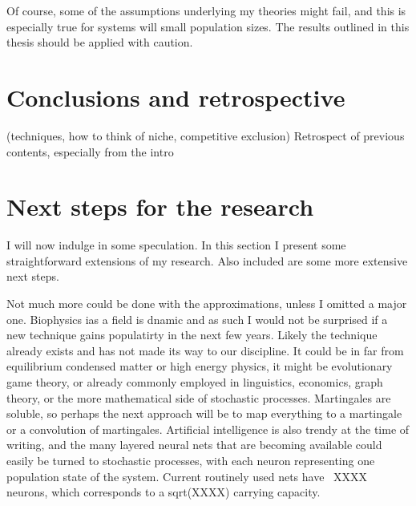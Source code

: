 Of course, some of the assumptions underlying my theories might fail, and this is especially true for systems will small population sizes. 
The results outlined in this thesis should be applied with caution. 



\section{Conclusions and retrospective}
 (techniques, how to think of niche, competitive exclusion)
Retrospect of previous contents, especially from the intro


\section{Next steps for the research}
I will now indulge in some speculation. 
In this section I present some straightforward extensions of my research. 
Also included are some more extensive next steps. 

Not much more could be done with the approximations, unless I omitted a major one. 
Biophysics ias a field is dnamic and as such I would not be surprised if a new technique gains populatirty in the next few years. 
Likely the technique already exists and has not made its way to our discipline. 
It could be in far from equilibrium condensed matter or high energy physics, it might be evolutionary game theory, or already commonly employed in linguistics, economics, graph theory, or the more mathematical side of stochastic processes. 
Martingales are soluble, so perhaps the next approach will be to map everything to a martingale or a convolution of martingales. 
Artificial intelligence is also trendy at the time of writing, and the many layered neural nets that are becoming available could easily be turned to stochastic processes, with each neuron representing one population state of the system. 
Current routinely used nets have ~XXXX neurons, which corresponds to a sqrt(XXXX) carrying capacity. 

